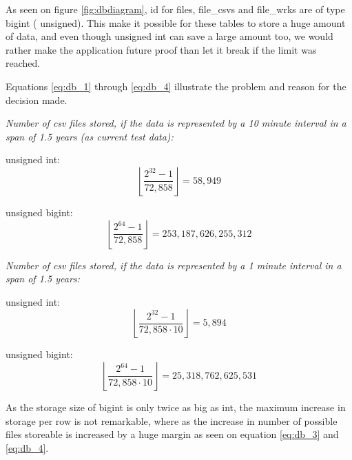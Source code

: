 As seen on figure \ref{fig:dbdiagram}, \textsf{id} for  \textsf{files, file\_csvs} and  \textsf{file\_wrks} are of type \textsf{bigint} ( \textsf{unsigned}). This make it possible for these tables to store a huge amount of data, and even though \textsf{unsigned int} can save a large amount too, we would rather make the application future proof than let it break if the limit was reached.

Equations \ref{eq:db_1} through \ref{eq:db_4} illustrate the problem and reason for the decision made.

\emph{Number of csv files stored, if the data is represented by a 10 minute interval in a span of 1.5 years (as current test data):}

\textsf{unsigned int}: 
\begin{equation}
\label{eq:db_1}
\left\lfloor \frac{2^{32}-1}{72,858} \right\rfloor = 58,949
\end{equation}

\textsf{unsigned bigint}:
\begin{equation}
\label{eq:db_2}
\left\lfloor \frac{2^{64}-1}{72,858} \right\rfloor = 253,187,626,255,312
\end{equation}

\emph{Number of csv files stored, if the data is represented by a 1 minute interval in a span of 1.5 years:}

\textsf{unsigned int}:
\begin{equation}
\label{eq:db_3}
\left\lfloor \frac{2^{32}-1}{72,858 \cdot 10} \right\rfloor = 5,894
\end{equation}

\textsf{unsigned bigint}:
\begin{equation}
\label{eq:db_4}
\left\lfloor \frac{2^{64}-1}{72,858 \cdot 10} \right\rfloor = 25,318,762,625,531
\end{equation}

As the storage size of \textsf{bigint} is only twice as big as \textsf{int}, the maximum increase in storage per row is not remarkable, where as the increase in number of possible files storeable is increased by a huge margin as seen on equation \ref{eq:db_3} and \ref{eq:db_4}.